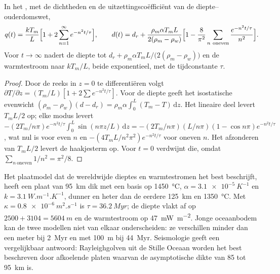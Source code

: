 \begin{proposition}\label{prop:b3:lithosphere-thermal-models:plate-depth}
In het , met de dichtheden en de uitzettingscoëfficiënt van de
diepte--ouderdomswet,
\[
  q(t) = \frac{kT_m}{L}\Bigl[1 + 2\sum_{n=1}^\infty e^{-n^2t/\tau}\Bigr],\qquad
  d(t) = d_r + \frac{\rho_m\alpha T_mL}{2(\rho_m - \rho_w)}
  \Bigl[1 - \frac{8}{\pi^2}\sum_{n\ \text{oneven}}\frac{e^{-n^2t/\tau}}{n^2}\Bigr].
\]
Voor $t \to \infty$ nadert de diepte tot $d_r + \rho_m\alpha T_mL/\bigl(2(\rho_m -
\rho_w)\bigr)$ en de warmtestroom naar $kT_m/L$, beide exponentieel, met de
tijdconstante $\tau$.
\end{proposition}

\begin{proof}
Door de reeks in $z = 0$ te differentiëren volgt $\partial T/\partial z = (T_m/L)[1 +
2\sum e^{-n^2t/\tau}]$. Voor de diepte geeft het isostatische evenwicht $(\rho_m -
\rho_w)(d - d_r) = \rho_m\alpha\int_0^L(T_m - T)\,\mathrm dz$. Het lineaire deel
levert $T_mL/2$ op; elke modus levert $-(2T_m/n\pi)e^{-n^2t/\tau}
\int_0^L\sin(n\pi z/L)\,\mathrm dz = -(2T_m/n\pi)(L/n\pi)(1 - \cos n\pi)
e^{-n^2t/\tau}$, wat nul is voor even $n$ en $-(4T_mL/n^2\pi^2)
e^{-n^2t/\tau}$ voor oneven $n$. Het afzonderen van $T_mL/2$ levert de haakjesterm op. Voor $t = 0$
verdwijnt die, omdat $\sum_{n\ \text{oneven}}1/n^2 = \pi^2/8$.
\end{proof}

Het plaatmodel dat de wereldwijde dieptes en warmtestromen het best beschrijft, heeft een plaat
van \qty{95}{km} dik met een basis op \qty{1450}{\celsius}, $\alpha =
\qty{3.1e-5}{K^{-1}}$ en $k = \qty{3.1}{W.m^{-1}.K^{-1}}$, dunner en heter
dan de eerdere \qty{125}{km} en \qty{1350}{\celsius}. Met $\kappa =
\qty{0.8e-6}{m^2.s^{-1}}$ is $\tau = \qty{36.2}{Myr}$; de diepte vlakt af op
$2500 + 3104 = \qty{5604}{m}$ en de warmtestroom op \qty{47}{mW.m^{-2}}. Jonge
oceaanbodem kan de twee modellen niet van elkaar onderscheiden: ze verschillen minder dan een meter
bij \qty{2}{Myr} en met \qty{100}{m} bij \qty{44}{Myr}. Seismologie geeft een vergelijkbaar
antwoord: Rayleighgolven uit de Stille Oceaan worden het best beschreven door afkoelende platen
waarvan de asymptotische dikte van 85 tot \qty{95}{km} is.

